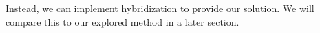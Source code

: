 \documentclass[11pt]{article}
\begin{document}
Instead, we can implement hybridization to provide our solution. We will compare this to our explored method in a later section.

\end{document}
